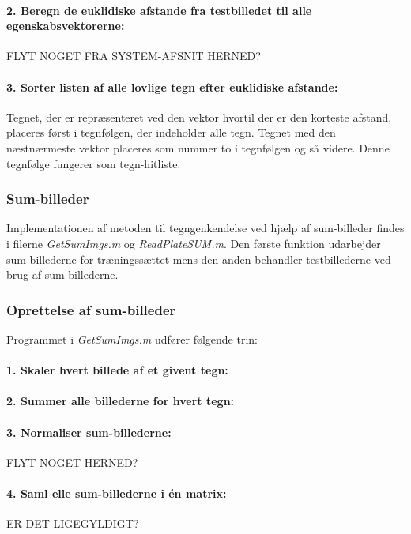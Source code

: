\paragraph{2. Beregn de euklidiske afstande fra testbilledet til alle egenskabsvektorerne:} FLYT NOGET FRA SYSTEM-AFSNIT HERNED?

\paragraph{3. Sorter listen af alle lovlige tegn efter euklidiske afstande:} Tegnet, der er repræsenteret ved den vektor hvortil der er den korteste afstand, placeres først i tegnfølgen, der indeholder alle tegn. Tegnet med den næstnærmeste vektor placeres som nummer to i tegnfølgen og så videre. Denne tegnfølge fungerer som tegn-hitliste.

\subsubsection{Sum-billeder}

Implementationen af metoden til tegngenkendelse ved hjælp af sum-billeder findes i filerne \textit{GetSumImgs.m} og \textit{ReadPlateSUM.m}. Den første funktion udarbejder sum-billederne for træningssættet mens den anden behandler testbillederne ved brug af sum-billederne.

\subsubsection*{Oprettelse af sum-billeder}
Programmet i \textit{GetSumImgs.m} udfører følgende trin:

\paragraph{1. Skaler hvert billede af et givent tegn:}

\paragraph{2. Summer alle billederne for hvert tegn:}

\paragraph{3. Normaliser sum-billederne:} FLYT NOGET HERNED?

\paragraph{4. Saml elle sum-billederne i én matrix:} ER DET LIGEGYLDIGT?

